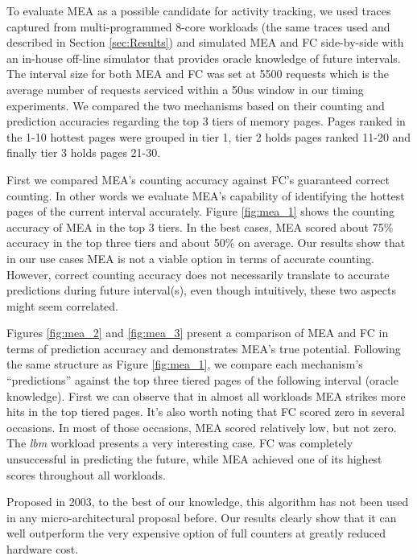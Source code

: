 To evaluate MEA as a possible candidate for activity tracking, we used traces captured from multi-programmed 8-core workloads (the same traces used and described in Section \ref{sec:Results}) and simulated MEA and FC side-by-side with an in-house off-line simulator that provides oracle knowledge of future intervals. The interval size for both MEA and FC was set at 5500 requests which is the average number of requests serviced within a 50us window in our timing experiments. We compared the two mechanisms based on their counting and prediction accuracies regarding the top 3 tiers of memory pages. Pages ranked in the 1-10 hottest pages were grouped in tier 1, tier 2 holds pages ranked 11-20 and finally tier 3 holds pages 21-30.

First we compared MEA's counting accuracy against FC's guaranteed correct counting. In other words we evaluate MEA's capability of identifying the hottest pages of the current interval accurately. Figure \ref{fig:mea_1} shows the counting accuracy of MEA in the top 3 tiers. In the best cases, MEA scored about 75\% accuracy in the top three tiers and about 50\% on average. Our results show that in our use cases MEA is not a viable option in terms of accurate counting. However, correct counting accuracy does not necessarily translate to accurate predictions during future interval(s), even though intuitively, these two aspects might seem correlated.

Figures \ref{fig:mea_2} and \ref{fig:mea_3} present a comparison of MEA and FC in terms of prediction accuracy and demonstrates MEA's true potential. Following the same structure as Figure \ref{fig:mea_1}, we compare each mechanism's ``predictions'' against the top three tiered pages of the following interval (oracle knowledge). First we can observe that in almost all workloads MEA strikes more hits in the top tiered pages. It's also worth noting that FC scored zero in several occasions. In most of those occasions, MEA scored relatively low, but not zero. The \textit{lbm} workload presents a very interesting case. FC was completely unsuccessful in predicting the future, while MEA achieved one of its highest scores throughout all workloads.

Proposed in 2003, to the best of our knowledge, this algorithm has not been used in any micro-architectural proposal before. Our results clearly show that it can well outperform the very expensive option of full counters at greatly reduced hardware cost.
